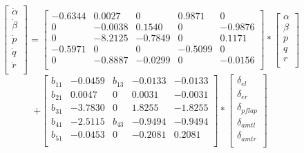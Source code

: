 \documentclass[11pt]{article}
\begin{document}
\begin{equation*}
\begin{bmatrix}
\dot{\alpha} \\
\dot{\beta} \\
\dot{p} \\
\dot{q} \\
\dot{r} \\
\end{bmatrix} =
\begin{bmatrix}
-0.6344 & 0.0027 & 0 & 0.9871 & 0 \\
0 & -0.0038 & 0.1540 & 0 & -0.9876 \\
0 & -8.2125 & -0.7849 & 0 & 0.1171 \\
-0.5971 & 0 & 0 & -0.5099 & 0 \\
0 & -0.8887 & -0.0299 & 0 & -0.0156 \\
\end{bmatrix} *
\begin{bmatrix}
\alpha \\
\beta \\
p \\
q \\
r \\
\end{bmatrix}
\end{equation*}
\begin{equation}
+ 
\begin{bmatrix}
b_{11} & -0.0459 & b_{13} & -0.0133 & -0.0133 \\
b_{21} & 0.0047 & 0 & 0.0031 & -0.0031 \\
b_{31} & -3.7830 & 0 & 1.8255 & -1.8255 \\
b_{41} & -2.5115 & b_{43} & -0.9494 & -0.9494 \\
b_{51} & -0.0453 & 0 & -0.2081 & 0.2081 \\
\end{bmatrix} *
\begin{bmatrix}
\delta_{el} \\
\delta_{er} \\
\delta_{pflap} \\
\delta_{amtl} \\
\delta_{amtr} \\
\end{bmatrix}
\end{equation}
\end{document}
